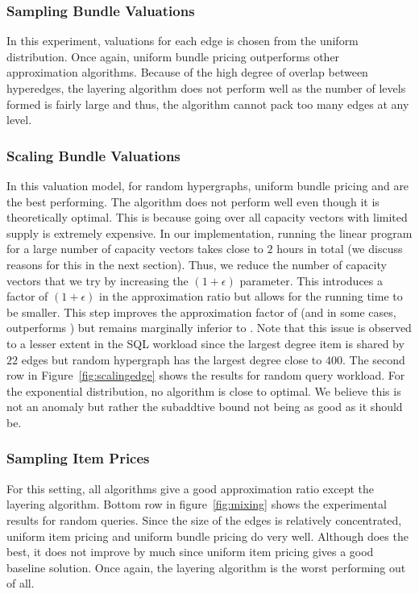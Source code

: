 \subsubsection{Sampling Bundle Valuations}

In this experiment, valuations for each edge is chosen from the uniform distribution. Once again, uniform bundle pricing outperforms other approximation algorithms. Because of the high degree of overlap between hyperedges, the layering algorithm does not perform well as the number of levels formed is fairly large and thus, the algorithm cannot pack too many edges at any level.

\subsubsection{Scaling Bundle Valuations} In this valuation model, for random hypergraphs, uniform bundle pricing and \lpip are the best performing. The \cip algorithm does not perform well even though it is theoretically optimal. This is because going over all capacity vectors with limited supply is extremely expensive. In our implementation, running the linear program for a large number of capacity vectors takes close to $2$ hours in total (we discuss reasons for this in the next section). Thus, we reduce the number of capacity vectors that we try by increasing the $(1+\epsilon)$ parameter. This introduces a factor of $(1+\epsilon)$ in the approximation ratio but allows for the running time to be smaller. This step improves the approximation factor of \cip (and in some cases, outperforms \lpip) but remains marginally inferior to \lpip . Note that this issue is observed to a lesser extent in the SQL workload since the largest degree item is shared by $22$ edges but random hypergraph has the largest degree close to $400$. The second row in Figure~\ref{fig:scalingedge} shows the results for random query workload. For the exponential distribution, no algorithm is close to optimal. We believe this is not an anomaly but rather the subaddtive bound not being as good as it should be.

\subsubsection{Sampling Item Prices} For this setting, all algorithms give a good approximation ratio except the layering algorithm. Bottom row in figure~\ref*{fig:mixing} shows the experimental results for random queries. Since the size of the edges is relatively concentrated, uniform item pricing and uniform bundle pricing do very well. Although \lpip does the best, it does not improve by much since uniform item pricing gives a good baseline solution.  Once again, the layering algorithm is the worst performing out of all.



